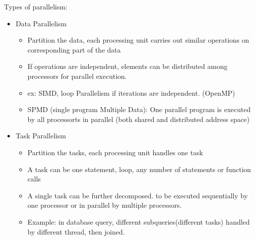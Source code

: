 \documentclass{article}
\begin{document}
Types of parallelism:
\begin{itemize}
    \item Data Parallelism
          \begin{itemize}
              \item Partition the data, each processing unit carries out similar operations on corresponding part of the data
              \item If operations are independent, elements can be distributed among processors for parallel execution.
              \item ex: SIMD, loop Parallelism if iterations are independent. (OpenMP)
              \item SPMD (single program Multiple Data): One parallel program is executed by all processorts in parallel (both shared and distributed address space)
          \end{itemize}
    \item Task Parallelism
          \begin{itemize}
              \item Partition the tasks, each processing unit handles one task
              \item A task can be one statement, loop, any number of statements or function calls
              \item A single task can be further decomposed. to be executed sequentially by one processor or in parallel by multiple processors.
              \item Example: in database query, different subqueries(different tasks) handled by different thread, then joined.
          \end{itemize}
\end{itemize}
\end{document}
